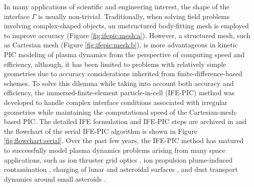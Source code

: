 \documentclass{siamart171218}
\begin{document}
In many applications of scientific and engineering interest,
the shape of the interface $\Gamma$ is usually non-trivial.
Traditionally, when solving field problems involving complex-shaped objects,
an unstructured body-fitting mesh is employed to improve accuracy
(Figure \ref{fig:ifepic:mesh:a}).
However, a structured mesh, such as Cartesian mesh (Figure \ref{fig:ifepic:mesh:b}),
is more advantageous in kinetic PIC modeling
of plasma dynamics from the perspective of computing speed and efficiency,
although, it has been limited to problems with relatively simple geometries
due to accuracy considerations inherited from finite-difference-based schemes.
To solve this dilemma while taking into account both accuracy and efficiency,
the immersed-finite-element particle-in-cell (IFE-PIC) method
was developed
to handle complex interface conditions associated with irregular geometries
while maintaining the computational speed of the Cartesian-mesh-based PIC.
The detailed IFE formulation and IFE-PIC steps
are archived in \cite{Han_ife_jcp2016}
and the flowchart of the serial IFE-PIC algorithm
is shown in Figure \ref{fig:flowchart:serial}.
Over the past few years, the IFE-PIC method has matured to successfully model
plasma dynamics problems arising from many space applications,
such as ion thruster grid optics
\cite{RK_AIAA_2005_3691_WholeSubscaleIonOptics,RK_JPP_2007_WholeIonOptics},
ion propulsion plume-induced contamination
\cite{RK_IEEE_2006_Plume_HybridGrid,JW_IEEE_2006_PlumeParallel,
DH_AIAA_2013_3888_JPC},
charging of lunar and asteroidal surfaces
\cite{Han_usc_dissertation2015,Han_ife_jcp2016,Han_ieee2016_charging,
YCao_YChu_XMHe_TLin_1,
Han_jsr_2018_lunar,
Han_ieeetps2019_asteroid,
Will_ieeetps2019_asteroid},
and dust transport dynamics around small asteroids
\cite{Yu_AIAA2016_5447_asteroid}.
\end{document}
